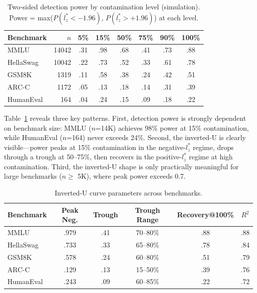 \documentclass[11pt,a4paper]{article}
\begin{document}
\begin{table}[t]
\centering
\caption{Two-sided detection power by contamination level (simulation). Power = max($P(l_{z}^{*}<{-}1.96)$, $P(l_{z}^{*}>{+}1.96)$) at each level.}
\label{tab:sim-power}
\small
\begin{tabular}{lrcccccc}
\toprule
\textbf{Benchmark} & $n$ & \textbf{5\%} & \textbf{15\%} & \textbf{50\%} & \textbf{75\%} & \textbf{90\%} & \textbf{100\%} \\
\midrule
MMLU       & 14042 & .31 & .98 & .68 & .41 & .73 & .88 \\
HellaSwag  & 10042 & .22 & .73 & .52 & .33 & .61 & .78 \\
GSM8K      & 1319  & .11 & .58 & .38 & .24 & .42 & .51 \\
ARC-C      & 1172  & .05 & .13 & .18 & .14 & .31 & .39 \\
HumanEval  & 164   & .04 & .24 & .15 & .09 & .18 & .22 \\
\bottomrule
\end{tabular}
\end{table}

Table~\ref{tab:sim-power} reveals three key patterns.
First, detection power is strongly dependent on benchmark size: MMLU ($n$=14K) achieves 98\% power at 15\% contamination, while HumanEval ($n$=164) never exceeds 24\%.
Second, the inverted-U is clearly visible---power peaks at 15\% contamination in the negative-$l_{z}^{*}$ regime, drops through a trough at 50--75\%, then recovers in the positive-$l_{z}^{*}$ regime at high contamination.
Third, the inverted-U shape is only practically meaningful for large benchmarks ($n \geq$ 5K), where peak power exceeds 0.7.

\begin{table}[t]
\centering
\caption{Inverted-U curve parameters across benchmarks.}
\label{tab:inverted-u}
\small
\begin{tabular}{lccccc}
\toprule
\textbf{Benchmark} & \textbf{Peak Neg.} & \textbf{Trough} & \textbf{Trough Range} & \textbf{Recovery@100\%} & $R^2$ \\
\midrule
MMLU       & .979 & .41 & 70--80\% & .88 & .88 \\
HellaSwag  & .733 & .33 & 65--80\% & .78 & .84 \\
GSM8K      & .578 & .24 & 60--80\% & .51 & .79 \\
ARC-C      & .129 & .13 & 15--50\% & .39 & .76 \\
HumanEval  & .243 & .09 & 60--85\% & .22 & .72 \\
\bottomrule
\end{tabular}
\end{table}
\end{document}
